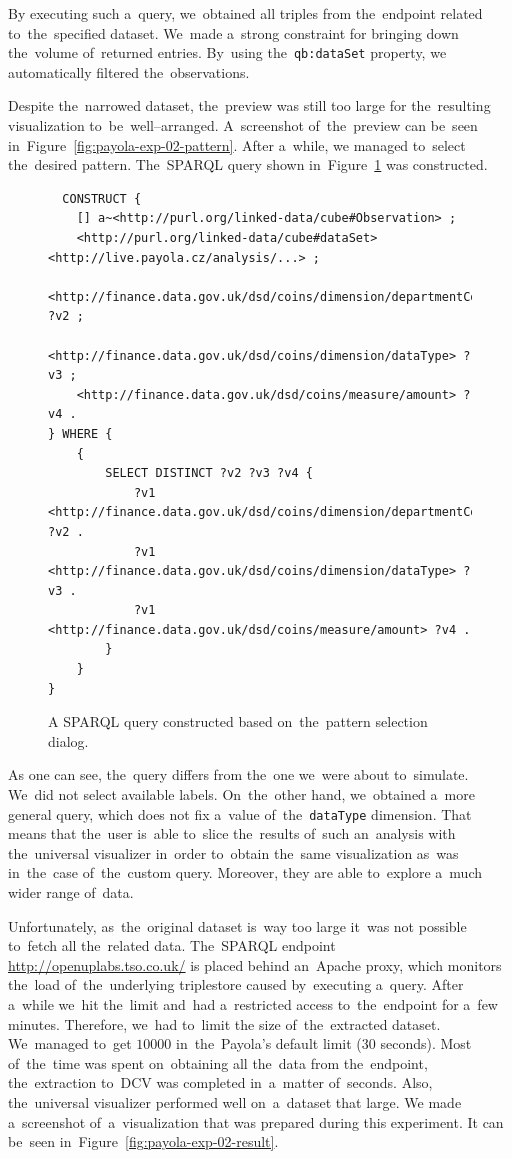 By executing such a~query, we~obtained all triples from the~endpoint 
related to~the~specified dataset. We~made a~strong constraint for bringing 
down the~volume of~returned entries. By~using the~\texttt{qb:dataSet} property, 
we automatically filtered the~observations.

Despite the~narrowed dataset, the~preview was still too large 
for the~resulting visualization to~be~well--arranged. A~screenshot of~the~preview can be~seen in~Figure~\ref{fig:payola-exp-02-pattern}. After a~while,
we managed to~select the~desired 
pattern. The~SPARQL query shown in~Figure~\ref{fig:coins-pattern-result} was 
constructed.

\begin{figure}
  \scriptsize
\begin{verbatim}
  CONSTRUCT {
    [] a~<http://purl.org/linked-data/cube#Observation> ;
    <http://purl.org/linked-data/cube#dataSet> <http://live.payola.cz/analysis/...> ;
    <http://finance.data.gov.uk/dsd/coins/dimension/departmentCode> ?v2 ;
    <http://finance.data.gov.uk/dsd/coins/dimension/dataType> ?v3 ;
    <http://finance.data.gov.uk/dsd/coins/measure/amount> ?v4 .
} WHERE {
    {
        SELECT DISTINCT ?v2 ?v3 ?v4 {
            ?v1 <http://finance.data.gov.uk/dsd/coins/dimension/departmentCode> ?v2 .
            ?v1 <http://finance.data.gov.uk/dsd/coins/dimension/dataType> ?v3 .
            ?v1 <http://finance.data.gov.uk/dsd/coins/measure/amount> ?v4 .
        }
    }
} 
\end{verbatim}
\caption{A SPARQL query constructed based on~the~pattern selection dialog.}
\label{fig:coins-pattern-result}
\end{figure}

As one can see, the~query differs from the~one we~were about to~simulate. We~did not select available labels. On~the~other hand, we~obtained a~more general 
query, which does not fix a~value of~the~\texttt{dataType} dimension. That means 
that the~user is~able to~slice the~results of~such an~analysis with the~universal 
visualizer in~order to~obtain the~same visualization as~was in~the~case of~the~custom 
query. Moreover, they are able to~explore a~much wider range of~data.  

\begin{sloppypar}
Unfortunately, as~the~original dataset is~way too large it~was not possible to~fetch all the~related data. The~SPARQL endpoint \mbox{\url{http://openuplabs.tso.co.uk/}}
is placed behind an~Apache proxy, which monitors the~load of~the~underlying 
triplestore caused by~executing a~query. After a~while we~hit the~limit and~had a~restricted access to~the~endpoint for a~few minutes. Therefore, we~had to~limit 
the size of~the~extracted dataset. We~managed to~get $10000$ in~the~Payola's 
default limit (30 seconds). Most of~the~time was spent on~obtaining all the~data from the~endpoint, the~extraction to~DCV was completed in~a~matter of~seconds. Also, the~universal visualizer performed well on~a~dataset that large.
We made a~screenshot of~a~visualization that was prepared during this experiment.
It can be~seen in~Figure~\ref{fig:payola-exp-02-result}.
\end{sloppypar}

